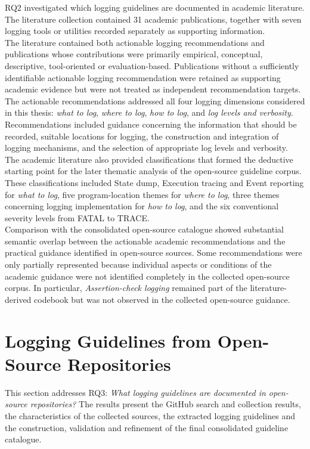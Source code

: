 RQ2 investigated which logging guidelines are documented in academic literature.
The literature collection contained 31 academic publications, together with seven
logging tools or utilities recorded separately as supporting information.
\\
The literature contained both actionable logging recommendations and publications
whose contributions were primarily empirical, conceptual, descriptive,
tool-oriented or evaluation-based. Publications without a sufficiently identifiable
actionable logging recommendation were retained as supporting academic evidence but
were not treated as independent recommendation targets.
\\
The actionable recommendations addressed all four logging dimensions considered in
this thesis: \textit{what to log}, \textit{where to log}, \textit{how to log}, and
\textit{log levels and verbosity}. Recommendations included guidance concerning the
information that should be recorded, suitable locations for logging, the
construction and integration of logging mechanisms, and the selection of
appropriate log levels and verbosity.
\\
The academic literature also provided classifications that formed the deductive
starting point for the later thematic analysis of the open-source guideline corpus.
These classifications included State dump, Execution tracing and Event reporting
for \textit{what to log}, five program-location themes for \textit{where to log},
three themes concerning logging implementation for \textit{how to log}, and the
six conventional severity levels from FATAL to TRACE.
\\
Comparison with the consolidated open-source catalogue showed substantial semantic
overlap between the actionable academic recommendations and the practical guidance
identified in open-source sources. Some recommendations were only partially
represented because individual aspects or conditions of the academic guidance were
not identified completely in the collected open-source corpus. In particular,
\textit{Assertion-check logging} remained part of the literature-derived codebook
but was not observed in the collected open-source guidance.

\section{Logging Guidelines from Open-Source Repositories}
\label{sec:results-open-source}
This section addresses RQ3: \textit{What logging guidelines are documented in
open-source repositories?}
The results present the GitHub search and collection results, the characteristics
of the collected sources, the extracted logging guidelines and the construction,
validation and refinement of the final consolidated guideline catalogue.

